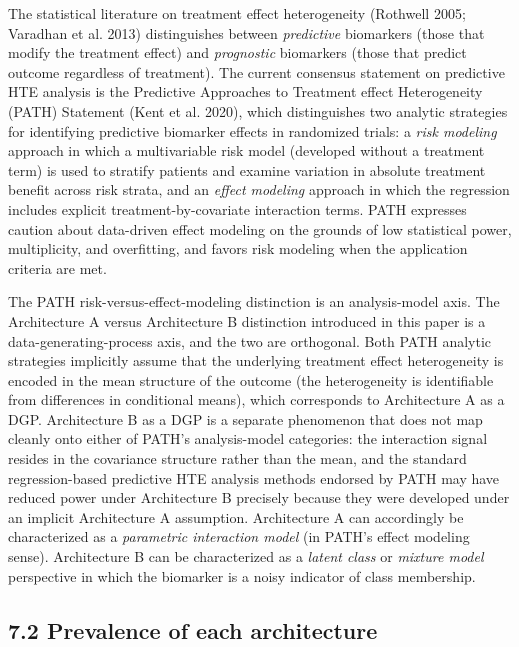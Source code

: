 \documentclass[11pt]{article}
\begin{document}
The statistical literature on treatment effect heterogeneity
(Rothwell 2005; Varadhan et al. 2013) distinguishes between
\textit{predictive} biomarkers (those that modify the treatment
effect) and \textit{prognostic} biomarkers (those that predict
outcome regardless of treatment). The current consensus
statement on predictive HTE analysis is the Predictive
Approaches to Treatment effect Heterogeneity (PATH) Statement
(Kent et al. 2020), which distinguishes two analytic strategies
for identifying predictive biomarker effects in randomized
trials: a \textit{risk modeling} approach in which a multivariable
risk model (developed without a treatment term) is used to
stratify patients and examine variation in absolute treatment
benefit across risk strata, and an \textit{effect modeling} approach
in which the regression includes explicit treatment-by-covariate
interaction terms. PATH expresses caution about data-driven
effect modeling on the grounds of low statistical power,
multiplicity, and overfitting, and favors risk modeling when
the application criteria are met.

The PATH risk-versus-effect-modeling distinction is an
analysis-model axis. The Architecture A versus Architecture B
distinction introduced in this paper is a data-generating-process
axis, and the two are orthogonal. Both PATH analytic strategies
implicitly assume that the underlying treatment effect
heterogeneity is encoded in the mean structure of the outcome
(the heterogeneity is identifiable from differences in
conditional means), which corresponds to Architecture A as a
DGP. Architecture B as a DGP is a separate phenomenon that does
not map cleanly onto either of PATH's analysis-model categories:
the interaction signal resides in the covariance structure
rather than the mean, and the standard regression-based
predictive HTE analysis methods endorsed by PATH may have
reduced power under Architecture B precisely because they were
developed under an implicit Architecture A assumption.
Architecture A can accordingly be characterized as a
\textit{parametric interaction model} (in PATH's effect modeling
sense). Architecture B can be characterized as a \textit{latent
class} or \textit{mixture model} perspective in which the biomarker is
a noisy indicator of class membership.

\subsection{7.2 Prevalence of each architecture}
\end{document}
